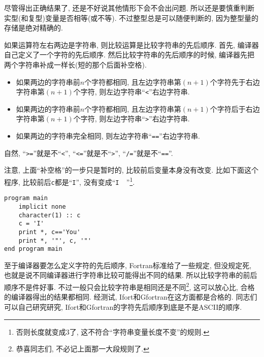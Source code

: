 尽管得出正确结果了, 还是不好说其他情形下会不会出问题. 所以还是要慎重判断实型(和复型)变量是否相等(或不等). 不过整型总是可以随便判断的, 因为整型量的存储是绝对精确的.

如果运算符左右两边是字符串, 则比较运算是比较字符串的先后顺序. 首先, 编译器自己定义了一个字符的先后顺序. 然后比较字符串的先后顺序的时候, 编译器先把两个字符串补成一样长(短的那个后面补空格).
\begin{itemize}
    \item 如果两边的字符串前$n$个字符都相同, 且左边字符串第$(n+1)$个字符先于右边字符串第$(n+1)$个字符, 则左边字符串``\verb|<|''右边字符串.
    \item 如果两边的字符串前$n$个字符都相同, 且左边字符串第$(n+1)$个字符后于右边字符串第$(n+1)$个字符, 则左边字符串``\verb|>|''右边字符串.
    \item 如果两边的字符串完全相同, 则左边字符串``\verb|==|''右边字符串.
\end{itemize}
自然, ``\verb|>=|''就是不``\verb|<|'', ``\verb|<=|''就是不``\verb|>|'', ``\verb|/=|''就是不``\verb|==|''.

注意, 上面``补空格''的一步只是暂时的, 比较前后变量本身没有改变. 比如下面这个程序, 比较前后\verb|c|都是``\verb|I|'', 没有变成``\verb|I  |''\footnote{
否则长度就变成3了, 这不符合``字符串变量长度不变''的规则.
}.
\begin{verbatim}
program main
    implicit none
    character(1) :: c
    c = 'I'
    print *, c=='You'
    print *, '"', c, '"'
end program main
\end{verbatim}

至于编译器要怎么定义字符的先后顺序, Fortran标准给了一些规定, 但没规定死, 也就是说不同编译器进行字符串比较可能得出不同的结果. 所以比较字符串的前后顺序不是件好事. 不过一般只会比较字符串是相同还是不同\footnote{
    恭喜同志们, 不必记上面那一大段规则了.
}, 这可以放心比, 合格的编译器得出的结果都相同. 经测试, Ifort和Gfortran在这方面都是合格的. 同志们可以自己研究研究, Ifort和Gfortran的字符先后顺序到底是不是ASCII的顺序.
